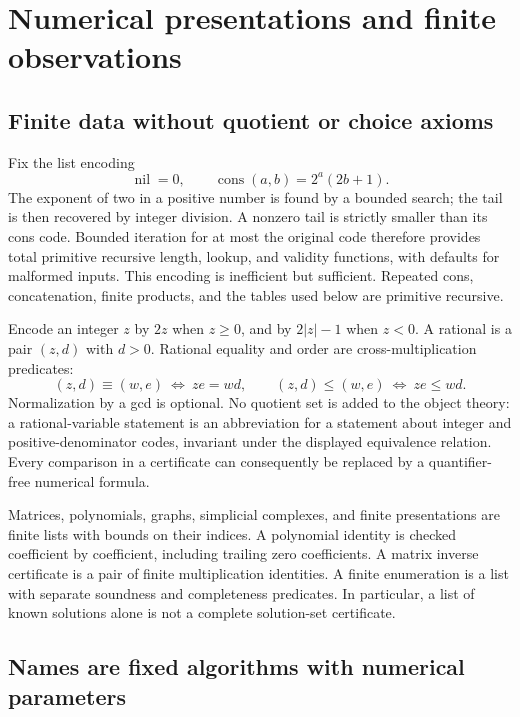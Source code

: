 \section{Numerical presentations and finite observations}
\label{sec:representations}

\subsection{Finite data without quotient or choice axioms}

Fix the list encoding
\[
 \operatorname{nil}=0,\qquad
 \operatorname{cons}(a,b)=2^a(2b+1).
\]
The exponent of two in a positive number is found by a bounded search;
the tail is then recovered by integer division.  A nonzero tail is
strictly smaller than its cons code.  Bounded iteration for at most the
original code therefore provides total primitive recursive length,
lookup, and validity functions, with defaults for malformed inputs.
This encoding is inefficient but sufficient.  Repeated cons, concatenation,
finite products, and the tables used below are primitive recursive.

Encode an integer \(z\) by \(2z\) when \(z\ge0\), and by
\(2|z|-1\) when \(z<0\).  A rational is a pair \((z,d)\) with
\(d>0\).  Rational equality and order are cross-multiplication predicates:
\[
 (z,d)\equiv(w,e)\ \Longleftrightarrow\ ze=wd,
 \qquad
 (z,d)\le(w,e)\ \Longleftrightarrow\ ze\le wd.
\]
Normalization by a gcd is optional.  No quotient set is added to the
object theory: a rational-variable statement is an abbreviation for a
statement about integer and positive-denominator codes, invariant under
the displayed equivalence relation.  Every comparison in a certificate
can consequently be replaced by a quantifier-free numerical formula.

Matrices, polynomials, graphs, simplicial complexes, and finite
presentations are finite lists with bounds on their indices.  A polynomial
identity is checked coefficient by coefficient, including trailing zero
coefficients.  A matrix inverse certificate is a pair of finite
multiplication identities.  A finite enumeration is a list with separate
soundness and completeness predicates.  In particular, a list of known
solutions alone is not a complete solution-set certificate.

\subsection{Names are fixed algorithms with numerical parameters}

